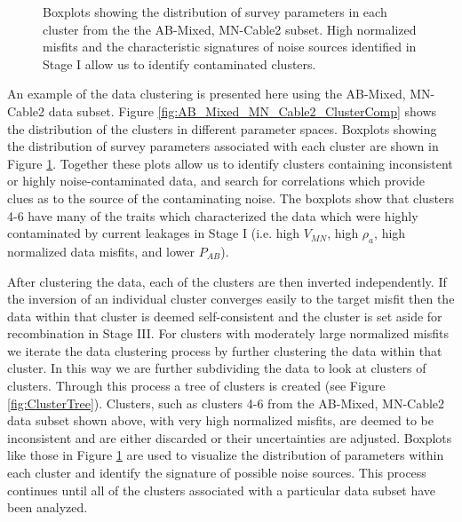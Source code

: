 \documentclass[final,authoryear,5p,times,twocolumn]{elsarticle}
\begin{document}
\begin{figure} [!ht]
\begin{center}
{       } %
    \end{center}
\caption{Boxplots showing the distribution of survey parameters in each cluster from the the AB-Mixed, MN-Cable2 subset. High normalized misfits and the characteristic signatures of noise sources identified in Stage I allow us to identify contaminated clusters.}
\label{fig:AB_Mixed_MN_Cable2_Cluster_PropBoxPlots}
\end{figure}

An example of the data clustering is presented here using the AB-Mixed, MN-Cable2 data subset. Figure \ref{fig:AB_Mixed_MN_Cable2_ClusterComp} shows the distribution of the clusters in different parameter spaces. Boxplots showing the distribution of survey parameters associated with each cluster are shown in Figure \ref{fig:AB_Mixed_MN_Cable2_Cluster_PropBoxPlots}. Together these plots allow us to identify clusters containing inconsistent or highly noise-contaminated data, and search for correlations which provide clues as to the source of the contaminating noise. The boxplots show that clusters 4-6 have many of the traits which characterized the data which were highly contaminated by current leakages in Stage I (i.e. high $V_{MN}$, high $\rho_a$, high normalized data misfits, and lower $P_{AB}$).

After clustering the data, each of the clusters are then inverted independently. If the inversion of an individual cluster converges easily to the target misfit then the data within that cluster is deemed self-consistent and the cluster is set aside for recombination in Stage III. For clusters with moderately large normalized misfits we iterate the data clustering process by further clustering the data within that cluster. In this way we are further subdividing the data to look at clusters of clusters. Through this process a tree of clusters is created (see Figure \ref{fig:ClusterTree}). Clusters, such as clusters 4-6 from the AB-Mixed, MN-Cable2 data subset shown above, with very high normalized misfits, are deemed to be inconsistent and are either discarded or their uncertainties are adjusted. Boxplots like those in Figure \ref{fig:AB_Mixed_MN_Cable2_Cluster_PropBoxPlots} are used to visualize the distribution of parameters within each cluster and identify the signature of possible noise sources. This process continues until all of the clusters associated with a particular data subset have been analyzed. 
\end{document}
